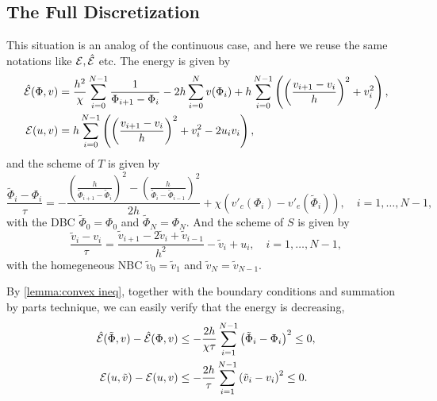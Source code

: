 \documentclass{article}
\begin{document}
\subsection{The Full Discretization}
This situation is an analog of the continuous case, and here we reuse the same notations
like $\mathcal E, \hat{\mathcal E}$ etc.
The energy is given by
\[
  \begin{aligned}
    \hat{\mathcal E}(\Phi, v)   & = \frac{h^2}\chi\sum_{i = 0}^{N - 1}\frac 1{\Phi_{i+1}-\Phi_i}
    - 2h\sum_{i = 0}^N v(\Phi_i)
    + h\sum_{i = 0}^{N-1} \left(\left(\frac{v_{i+1} - v_i}h\right)^2 + v_i^2\right),  \\
    \mathcal E(u, v) & = h\sum_{i = 0}^{N - 1}\left(
    \left(\frac{v_{i+1} - v_i}h\right)^2 + v_i^2 - 2u_iv_i
    \right),
  \end{aligned}
\]
and the scheme of $T$ is given by
\[
  \frac{\tilde\Phi_i - \Phi_i}{\tau} =
  -\frac{\left(\frac{h}{\tilde\Phi_{i+1} - \tilde\Phi_i}\right)^2
    -\left(\frac{h}{\tilde\Phi_{i} - \tilde\Phi_{i-1}}\right)^2}{2h}
  +\chi\left(v'_c(\Phi_i) - v'_e(\tilde\Phi_i)\right),
  \quad i = 1,\ldots, N-1,
\]
with the DBC $\tilde\Phi_0 = \Phi_0$ and $\tilde\Phi_N = \Phi_N$.
And the scheme of $S$ is given by
\[
  \frac{\tilde v_i -v_i}{\tau} =
  \frac{\tilde v_{i+1} - 2\tilde v_i + \tilde v_{i-1}}{h^2}
  - \tilde v_i + u_i,
  \quad i = 1,\ldots, N-1,
\]
with the homegeneous NBC $\tilde v_0 = \tilde v_1$ and $\tilde v_N = \tilde v_{N - 1}$.

By \cref{lemma:convex ineq}, together with the boundary conditions and summation by
parts technique, we can easily verify that the energy is decreasing,
\[\begin{aligned}
    \hat{\mathcal E}(\tilde\Phi, v) - \hat{\mathcal E}(\Phi, v)
    &\leq -\frac{2h}{\chi\tau}\sum_{i = 1}^{N-1}\left(\tilde\Phi_i - \Phi_i\right)^2
    \leq 0, \\
    \mathcal E(u, \tilde v) - \mathcal E(u, v)
    &\leq -\frac{2h}{\tau}\sum_{i = 1}^{N-1}\left(\tilde v_i - v_i\right)^2
    \leq 0.
  \end{aligned}\]
\end{document}
